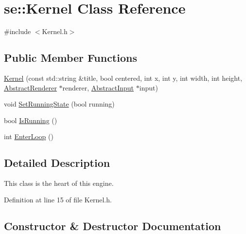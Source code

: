 \hypertarget{classse_1_1_kernel}{}\section{se\+:\+:Kernel Class Reference}
\label{classse_1_1_kernel}


{\ttfamily \#include $<$Kernel.\+h$>$}

\subsection*{Public Member Functions}
\begin{DoxyCompactItemize}
\item 
\mbox{\hyperlink{classse_1_1_kernel_abc8105369975f3df1199537b6efe5214}{Kernel}} (const std\+::string \&title, bool centered, int x, int y, int width, int height, \mbox{\hyperlink{classse_1_1_abstract_renderer}{Abstract\+Renderer}} $\ast$renderer, \mbox{\hyperlink{classse_1_1_abstract_input}{Abstract\+Input}} $\ast$input)
\item 
void \mbox{\hyperlink{classse_1_1_kernel_a66bc4af7514718abbfc307c2381f5327}{Set\+Running\+State}} (bool running)
\item 
bool \mbox{\hyperlink{classse_1_1_kernel_afe100d42354808a757b08a56a0387496}{Is\+Running}} ()
\item 
int \mbox{\hyperlink{classse_1_1_kernel_a1faeac6fce02ccd7ff76d94ad78e0754}{Enter\+Loop}} ()
\end{DoxyCompactItemize}


\subsection{Detailed Description}
This class is the heart of this engine. 

Definition at line 15 of file Kernel.\+h.



\subsection{Constructor \& Destructor Documentation}
\mbox{\label{classse_1_1_kernel_abc8105369975f3df1199537b6efe5214}} 
